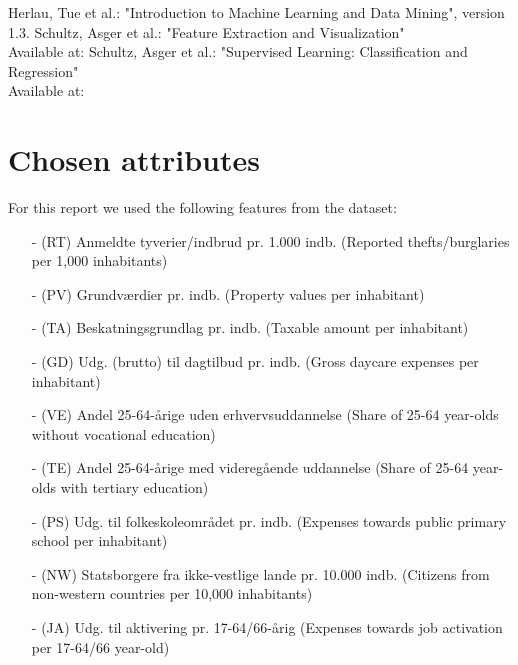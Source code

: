 \documentclass[11pt,fleqn]{article}
\numberwithin{footnote}{section}
\numberwithin{figure}{section}
\numberwithin{table}{section}
\begin{document}
\clearpage
\begin{thebibliography}{9}
	 Herlau, Tue et al.: "Introduction to Machine Learning and Data Mining", version 1.3.
	 Schultz, Asger et al.: "Feature Extraction and Visualization"\\
	Available at: 
	 Schultz, Asger et al.: "Supervised Learning: Classification and Regression"\\
	Available at: 
\end{thebibliography}

\appendix
\section{Chosen attributes}\label{app:attrs}
For this report we used the following features from the dataset:
\begin{itemize}
	\item[-] (RT) Anmeldte tyverier/indbrud pr. 1.000 indb. (Reported thefts/burglaries per 1,000 inhabitants)
	\item[-] (PV) Grundværdier pr. indb. (Property values per inhabitant)
	\item[-] (TA) Beskatningsgrundlag pr. indb. (Taxable amount per inhabitant)
	\item[-] (GD) Udg. (brutto) til dagtilbud pr. indb. (Gross daycare expenses per inhabitant)
	\item[-] (VE) Andel 25-64-årige uden erhvervsuddannelse (Share of 25-64 year-olds without vocational education)
	\item[-] (TE) Andel 25-64-årige med videregående uddannelse (Share of 25-64 year-olds with tertiary education)
	\item[-] (PS) Udg. til folkeskoleområdet pr. indb. (Expenses towards public primary school per inhabitant)
	\item[-] (NW) Statsborgere fra ikke-vestlige lande pr. 10.000 indb. (Citizens from non-western countries per 10,000 inhabitants)
	\item[-] (JA) Udg. til aktivering pr. 17-64/66-årig (Expenses towards job activation per 17-64/66 year-old)
\end{itemize}
\end{document}

